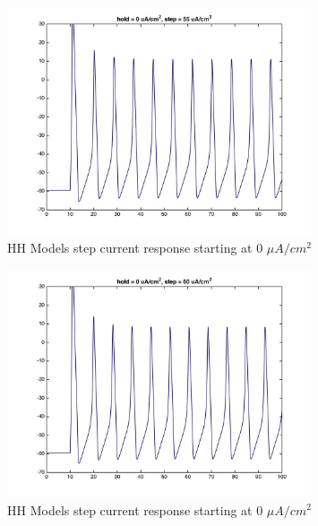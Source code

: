\documentclass{beamer}
\begin{document}
\begin{frame}
  \begin{figure}
    \centering
    \includegraphics[width = 0.8\textwidth]{./images/current_0_55.jpg}
    \caption{HH Models step current response starting at 0 $\mu A/cm^2$}
  \end{figure}
\end{frame}


\begin{frame}
  \begin{figure}
    \centering
    \includegraphics[width = 0.8\textwidth]{./images/current_0_60.jpg}
    \caption{HH Models step current response starting at 0 $\mu A/cm^2$}
  \end{figure}
\end{frame}
\end{document}
